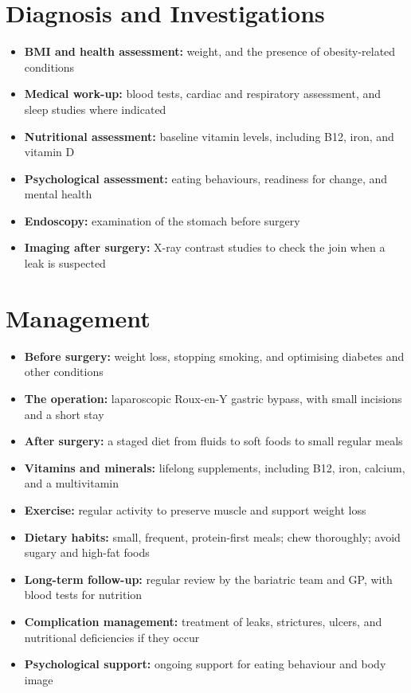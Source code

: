 \section*{Diagnosis and Investigations}
\begin{itemize}
    \item \textbf{BMI and health assessment:} weight, and the presence of obesity-related conditions
    \item \textbf{Medical work-up:} blood tests, cardiac and respiratory assessment, and sleep studies where indicated
    \item \textbf{Nutritional assessment:} baseline vitamin levels, including B12, iron, and vitamin D
    \item \textbf{Psychological assessment:} eating behaviours, readiness for change, and mental health
    \item \textbf{Endoscopy:} examination of the stomach before surgery
    \item \textbf{Imaging after surgery:} X-ray contrast studies to check the join when a leak is suspected
\end{itemize}

\section*{Management}
\begin{itemize}
    \item \textbf{Before surgery:} weight loss, stopping smoking, and optimising diabetes and other conditions
    \item \textbf{The operation:} laparoscopic Roux-en-Y gastric bypass, with small incisions and a short stay
    \item \textbf{After surgery:} a staged diet from fluids to soft foods to small regular meals
    \item \textbf{Vitamins and minerals:} lifelong supplements, including B12, iron, calcium, and a multivitamin
    \item \textbf{Exercise:} regular activity to preserve muscle and support weight loss
    \item \textbf{Dietary habits:} small, frequent, protein-first meals; chew thoroughly; avoid sugary and high-fat foods
    \item \textbf{Long-term follow-up:} regular review by the bariatric team and GP, with blood tests for nutrition
    \item \textbf{Complication management:} treatment of leaks, strictures, ulcers, and nutritional deficiencies if they occur
    \item \textbf{Psychological support:} ongoing support for eating behaviour and body image
\end{itemize}

